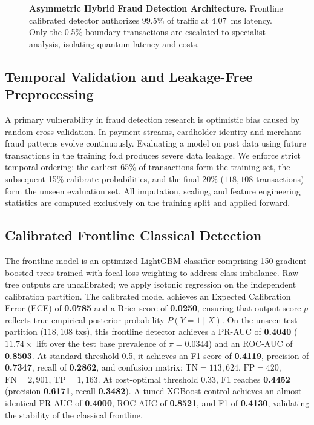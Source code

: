 \documentclass[10pt,a4paper]{article}
\begin{document}
\begin{figure}[h!]
\vspace{-3pt}
\caption{\textbf{Asymmetric Hybrid Fraud Detection Architecture.} Frontline calibrated detector authorizes 99.5\% of traffic at 4.07~ms latency. Only the 0.5\% boundary transactions are escalated to specialist analysis, isolating quantum latency and costs.}
\label{fig:arch}
\end{figure}
\vspace{-6pt}

\subsection{Temporal Validation and Leakage-Free Preprocessing}
A primary vulnerability in fraud detection research is optimistic bias caused by random cross-validation. In payment streams, cardholder identity and merchant fraud patterns evolve continuously. Evaluating a model on past data using future transactions in the training fold produces severe data leakage. We enforce strict temporal ordering: the earliest 65\% of transactions form the training set, the subsequent 15\% calibrate probabilities, and the final 20\% ($118,108$ transactions) form the unseen evaluation set. All imputation, scaling, and feature engineering statistics are computed exclusively on the training split and applied forward.

\subsection{Calibrated Frontline Classical Detection}
The frontline model is an optimized LightGBM classifier comprising 150 gradient-boosted trees trained with focal loss weighting to address class imbalance. Raw tree outputs are uncalibrated; we apply isotonic regression on the independent calibration partition. The calibrated model achieves an Expected Calibration Error (ECE) of \textbf{0.0785} and a Brier score of \textbf{0.0250}, ensuring that output score $p$ reflects true empirical posterior probability $P(Y=1 \mid X)$. On the unseen test partition ($118,108$ txs), this frontline detector achieves a PR-AUC of \textbf{0.4040} ($11.74\times$ lift over the test base prevalence of $\pi = 0.0344$) and an ROC-AUC of \textbf{0.8503}. At standard threshold 0.5, it achieves an F1-score of \textbf{0.4119}, precision of \textbf{0.7347}, recall of \textbf{0.2862}, and confusion matrix: $\text{TN}=113,624$, $\text{FP}=420$, $\text{FN}=2,901$, $\text{TP}=1,163$. At cost-optimal threshold 0.33, F1 reaches \textbf{0.4452} (precision \textbf{0.6171}, recall \textbf{0.3482}). A tuned XGBoost control achieves an almost identical PR-AUC of \textbf{0.4000}, ROC-AUC of \textbf{0.8521}, and F1 of \textbf{0.4130}, validating the stability of the classical frontline.
\end{document}

